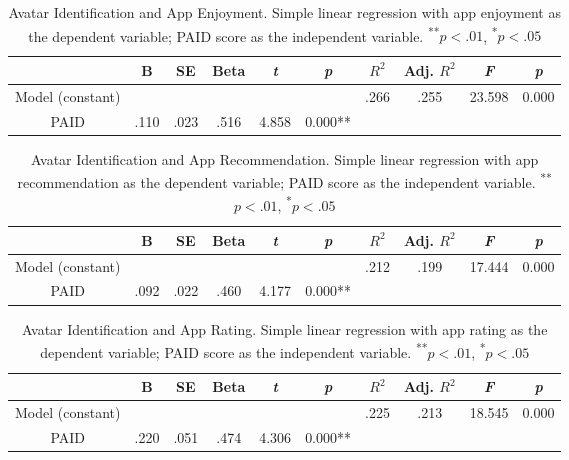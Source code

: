 
\begin{table}
  \caption{Avatar Identification and App Enjoyment. Simple linear regression with app enjoyment as the dependent variable; PAID score as the independent variable.
  \textsuperscript{**}$p<.01$, 
  \textsuperscript{*}$p<.05$} 
  \label{tab:appenjoy}
  \begin{tabular}{cccccccccc}
    \toprule
    &B&SE&Beta&\textit{t}&\textit{p}&$R^{2}$&Adj. $R^{2}$&\textit{F}&\textit{p}\\ %
    \midrule                                  
     Model (constant)& &  & &  & &.266&.255&23.598&0.000\\
     PAID&.110 &.023  &.516 &4.858   &0.000**&&&&\\
    \bottomrule
 \end{tabular}
\end{table}

\begin{table}
  \caption{Avatar Identification and App Recommendation. Simple linear regression with app recommendation as the dependent variable; PAID score as the independent variable.
  \textsuperscript{**}$p<.01$, 
  \textsuperscript{*}$p<.05$} 
  \label{tab:apprec}
 \begin{tabular}{cccccccccc}
    \toprule
    &B&SE&Beta&\textit{t}&\textit{p}&$R^{2}$&Adj. $R^{2}$&\textit{F}&\textit{p}\\ %
    \midrule                                  
     Model (constant)& &  & &  & &.212&.199&17.444&0.000\\
     PAID&.092 &.022  &.460 &4.177   &0.000**&&&&\\
    \bottomrule
 \end{tabular}
\end{table}

\begin{table}
  \caption{Avatar Identification and App Rating. Simple linear regression with app rating as the dependent variable; PAID score as the independent variable.
  \textsuperscript{**}$p<.01$, 
  \textsuperscript{*}$p<.05$} 
  \label{tab:appenjoy}
 \begin{tabular}{cccccccccc}
    \toprule
    &B&SE&Beta&\textit{t}&\textit{p}&$R^{2}$&Adj. $R^{2}$&\textit{F}&\textit{p}\\ %
    \midrule                                  
     Model (constant)& &  & &  & &.225&.213&18.545&0.000\\
     PAID&.220 &.051  &.474 &4.306   &0.000**&&&&\\
    \bottomrule
 \end{tabular}
\end{table}

